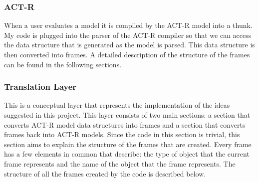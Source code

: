 

\subsubsection{ACT-R}

When a user evaluates a model it is compiled by the ACT-R model into a
thunk. My code is plugged into the parser of the ACT-R compiler so
that we can access the data structure that is generated as the model
is parsed. This data structure is then converted into frames. A
detailed description of the structure of the frames can be found in
the following sections.




\subsubsection{Translation Layer}

This is a conceptual layer that represents the implementation of the
ideas suggested in this project. This layer consists of two main
sections: a section that converts ACT-R model data structures into
frames and a section that converts frames back into ACT-R
models. Since the code in this section is trivial, this section aims
to explain the structure of the frames that are created. Every frame
has a few elements in common that describe: the type of object that the
current frame represents and the name of the object that the frame
represents. The structure of all the frames created by the code is
described below.


